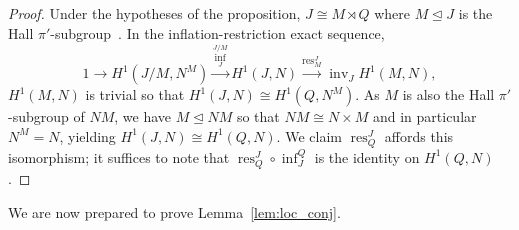 \documentclass{amsart}
\theoremstyle{definition}
\theoremstyle{remark}
\numberwithin{equation}{section}
\newcommand{\iso}{\cong}
\newcommand{\semi}{\rtimes}
\newcommand{\normal}{\trianglelefteq}
\DeclareMathOperator{\inv}{inv}
\DeclareMathOperator{\res}{res}
\begin{document}
\begin{proof}
	Under the hypotheses of the proposition, $J\iso M \semi Q$ where $M \normal J$ is the Hall $\pi'$-subgroup~\cite[Prop.~3.5]{Olt78}. In the inflation-restriction exact sequence,
	\begin{equation*}
		1 \to H^1(J/M, N^M) \xrightarrow{\operatorname{inf}^{J/M}_J} H^1(J, N) \xrightarrow{\res^J_M} \inv_J H^1(M, N),
	\end{equation*}
	$H^1(M, N)$ is trivial so that $H^1(J, N) \iso H^1(Q, N^M)$. As $M$ is also the Hall $\pi'$-subgroup of $NM$, we have $M \normal NM$ so that $NM\iso N \times M$ and in particular $N^M=N$, yielding $H^1(J, N) \iso H^1(Q, N)$. We claim $\res^J_Q$ affords this isomorphism; it suffices to note that $\res^J_Q \circ \operatorname{inf}^Q_J$ is the identity on $H^1(Q, N)$.
\end{proof}

We are now prepared to prove Lemma~\ref{lem:loc_conj}.
\end{document}
